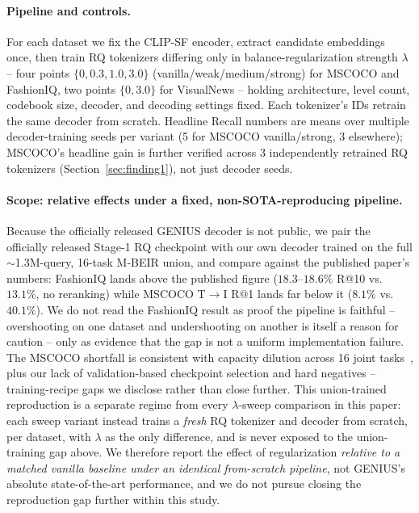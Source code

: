 \paragraph{Pipeline and controls.} For each dataset we fix the CLIP-SF encoder, extract candidate embeddings once, then train RQ tokenizers differing only in balance-regularization strength $\lambda$ -- four points $\{0,0.3,1.0,3.0\}$ (vanilla/weak/medium/strong) for MSCOCO and FashionIQ, two points $\{0,3.0\}$ for VisualNews -- holding architecture, level count, codebook size, decoder, and decoding settings fixed. Each tokenizer's IDs retrain the same decoder from scratch. Headline Recall numbers are means over multiple decoder-training seeds per variant (5 for MSCOCO vanilla/strong, 3 elsewhere); MSCOCO's headline gain is further verified across 3 independently retrained RQ tokenizers (Section~\ref{sec:finding1}), not just decoder seeds.

\paragraph{Scope: relative effects under a fixed, non-SOTA-reproducing pipeline.} Because the officially released GENIUS decoder is not public, we pair the officially released Stage-1 RQ checkpoint with our own decoder trained on the full $\sim$1.3M-query, 16-task M-BEIR union, and compare against the published paper's numbers: FashionIQ lands above the published figure ($18.3$--$18.6\%$ R@10 vs.\ $13.1\%$, no reranking) while MSCOCO T$\to$I R@1 lands far below it ($8.1\%$ vs.\ $40.1\%$). We do not read the FashionIQ result as proof the pipeline is faithful -- overshooting on one dataset and undershooting on another is itself a reason for caution -- only as evidence that the gap is not a uniform implementation failure. The MSCOCO shortfall is consistent with capacity dilution across 16 joint tasks~\cite{pradeep2023scale}, plus our lack of validation-based checkpoint selection and hard negatives -- training-recipe gaps we disclose rather than close further. This union-trained reproduction is a separate regime from every $\lambda$-sweep comparison in this paper: each sweep variant instead trains a \emph{fresh} RQ tokenizer and decoder from scratch, per dataset, with $\lambda$ as the only difference, and is never exposed to the union-training gap above. We therefore report the effect of regularization \emph{relative to a matched vanilla baseline under an identical from-scratch pipeline}, not GENIUS's absolute state-of-the-art performance, and we do not pursue closing the reproduction gap further within this study.
